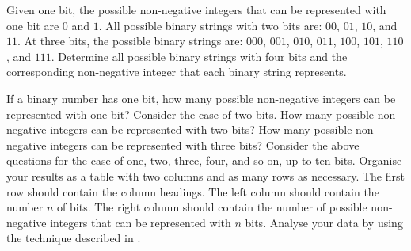 \documentclass[a4paper,oneside,12pt]{article}
\begin{document}
\begin{problem}
\begin{packedenum}
  \item\label{subprob:binary_4_bits}
    Given one bit, the possible non-negative integers that can be
    represented with one bit are $0$ and $1$.  All possible binary
    strings with two bits are: $00$, $01$, $10$, and $11$.  At three
    bits, the possible binary strings are: $000$, $001$, $010$, $011$,
    $100$, $101$, $110$, and $111$.  Determine all possible binary
    strings with four bits and the corresponding non-negative integer
    that each binary string represents.

  \item\label{subprob:binary_how_many_integers}
    If a binary number has one bit, how many possible non-negative
    integers can be represented with one bit?  Consider the case of
    two bits.  How many possible non-negative integers can be
    represented with two bits?  How many possible non-negative
    integers can be represented with three bits?  Consider the above
    questions for the case of one, two, three, four, and so on, up to
    ten bits.  Organise your results as a table with two columns and
    as many rows as necessary.  The first row should contain the
    column headings.  The left column should contain the number $n$ of
    bits.  The right column should contain the number of possible
    non-negative integers that can be represented with $n$ bits.
    Analyse your data by using the technique described in
    .


\end{packedenum}
\end{problem}
\end{document}
